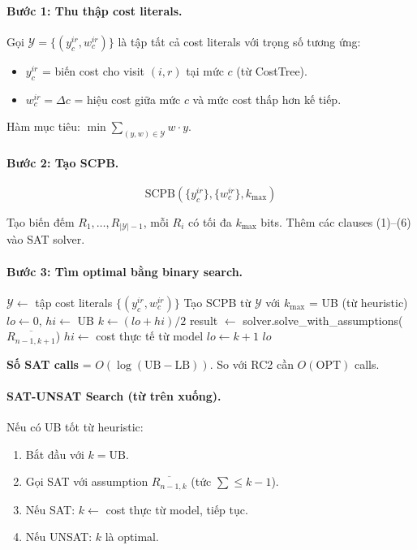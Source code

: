 \documentclass[11pt,a4paper]{article}
\begin{document}
\paragraph{Bước 1: Thu thập cost literals.} Gọi $\mathcal{Y} = \{(y_c^{ir}, w_c^{ir})\}$ là tập tất cả cost literals với trọng số tương ứng:
\begin{itemize}
  \item $y_c^{ir}$ = biến cost cho visit $(i,r)$ tại mức $c$ (từ CostTree).
  \item $w_c^{ir} = \Delta c$ = hiệu cost giữa mức $c$ và mức cost thấp hơn kế tiếp.
\end{itemize}

Hàm mục tiêu: $\min \sum_{(y, w) \in \mathcal{Y}} w \cdot y$.

\paragraph{Bước 2: Tạo SCPB.}
\[
\text{SCPB}(\{y_c^{ir}\}, \{w_c^{ir}\}, k_{\max})
\]

Tạo biến đếm $R_1, \ldots, R_{|\mathcal{Y}|-1}$, mỗi $R_i$ có tối đa $k_{\max}$ bits. Thêm các clauses (1)--(6) vào SAT solver.

\paragraph{Bước 3: Tìm optimal bằng binary search.}

\begin{algorithm}[H]
\caption{SAT + SCPB: Binary Search}
\begin{algorithmic}[1]
\State $\mathcal{Y} \gets$ tập cost literals $\{(y_c^{ir}, w_c^{ir})\}$
\State Tạo SCPB từ $\mathcal{Y}$ với $k_{\max}$ = UB (từ heuristic)
\State $lo \gets 0$, $hi \gets$ UB
  \State $k \gets (lo + hi) / 2$
  \State result $\gets$ solver.solve\_with\_assumptions($\overline{R_{n-1,k+1}}$)
    \State $hi \gets$ cost thực tế từ model
  \Else
    \State $lo \gets k + 1$
  \EndIf
\EndWhile
\State \Return $lo$
\end{algorithmic}
\end{algorithm}

\textbf{Số SAT calls} = $O(\log(\text{UB} - \text{LB}))$. So với RC2 cần $O(\text{OPT})$ calls.

\paragraph{SAT-UNSAT Search (từ trên xuống).} Nếu có UB tốt từ heuristic:
\begin{enumerate}
  \item Bắt đầu với $k = \text{UB}$.
  \item Gọi SAT với assumption $\overline{R_{n-1,k}}$ (tức $\sum \leq k-1$).
  \item Nếu SAT: $k \gets$ cost thực từ model, tiếp tục.
  \item Nếu UNSAT: $k$ là optimal.
\end{enumerate}
\end{document}

